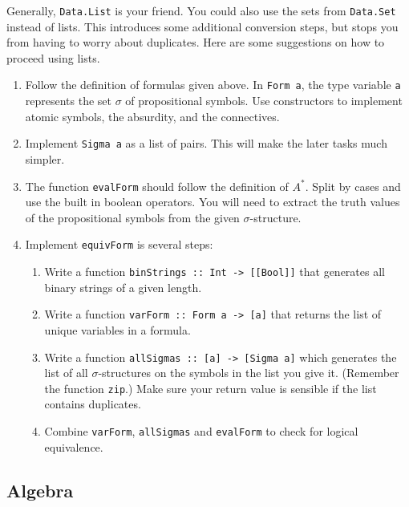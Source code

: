 \documentclass{article}[12pt]
\theoremstyle{definition}
\begin{document}
Generally, \verb|Data.List| is your friend. You could also use the sets from \verb|Data.Set| instead of lists. This introduces some additional conversion steps, but stops you from having to worry about duplicates. Here are some suggestions on how to proceed using lists. 
\begin{enumerate}
    \item Follow the definition of formulas given above. In \verb|Form a|, the type variable \verb|a| represents the set $\sigma$ of propositional symbols. Use constructors to implement atomic symbols, the absurdity, and the connectives.
    \item Implement \verb|Sigma a| as a list of pairs. This will make the later tasks much simpler.
    \item The function \verb|evalForm| should follow the definition of $A^*$. Split by cases and use the built in boolean operators. You will need to extract the truth values of the propositional symbols from the given $\sigma$-structure.
    \item Implement \verb|equivForm| is several steps:
    \begin{enumerate}
        \item Write a function \verb|binStrings :: Int -> [[Bool]]| that generates all binary strings of a given length. 
        \item Write a function \verb|varForm :: Form a -> [a]| that returns the list of unique variables in a formula. 
        \item Write a function \verb|allSigmas :: [a] -> [Sigma a]| which generates the list of all $\sigma$-structures on the symbols in the list you give it. (Remember the function \verb|zip|.) Make sure your return value is sensible if the list contains duplicates.
        \item Combine \verb|varForm|, \verb|allSigmas| and \verb|evalForm| to check for logical equivalence.
    \end{enumerate}
\end{enumerate}

\subsection{Algebra}
\noindent{}
\end{document}
